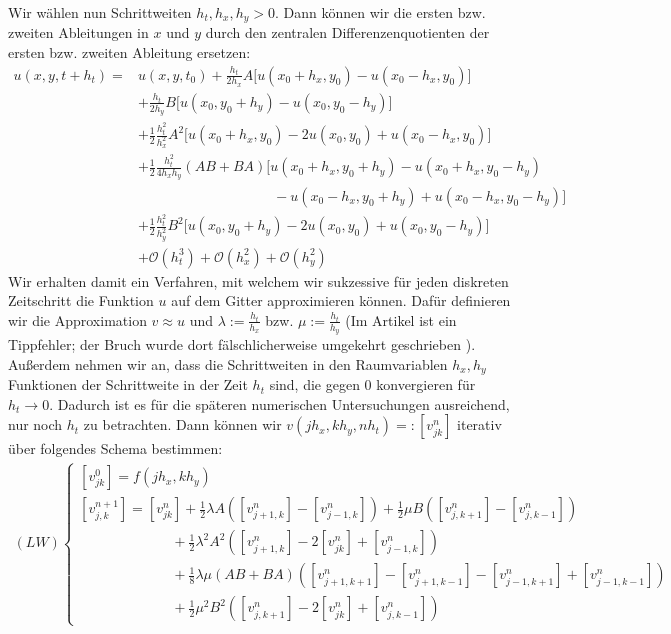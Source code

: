 \begin{ex}
    Wir wählen nun Schrittweiten $h_t, h_x, h_y > 0$. Dann können wir die ersten bzw. zweiten Ableitungen in $x$ und $y$ durch den zentralen Differenzenquotienten der ersten bzw. zweiten Ableitung ersetzen:
    \begin{align}
        u(x,y,t+h_t)  =&  u(x,y,t_0) + \frac{h_t}{2h_x} A \bigl[ u(x_0 + h_x, y_0) - u(x_0 - h_x, y_0) \bigr] \nonumber \\ 
        & + \frac{h_t}{2h_y} B \bigl[ u(x_0, y_0 + h_y) - u(x_0, y_0 - h_y) \bigr] \nonumber \\
        & + \frac{1}{2} \frac{h_t^2}{h_x^2} A^2 \bigl[ u(x_0 + h_x, y_0) - 2 u(x_0,y_0) 
        + u(x_0 - h_x, y_0) \bigr] \nonumber \\
        & + \frac{1}{2} \frac{h_t^2}{4h_x h_y} (AB+BA) \bigl[ u(x_0 + h_x, y_0 + h_y) - u(x_0 + h_x, y_0 - h_y) \nonumber \\[-10pt]
        & \phantom{mmmmmmmmmmm} - u(x_0 - h_x, y_0 + h_y) + u(x_0 - h_x, y_0 - h_y) \bigr] \nonumber \\
        & + \frac{1}{2} \frac{h_t^2}{h_y^2} B^2 \bigl[ u(x_0, y_0+ h_y) - 2 u(x_0,y_0) 
        + u(x_0 , y_0- h_y) \bigr] \nonumber \\
        & + \mathcal{O}(h_t^3) + \mathcal{O}(h_x^2) + \mathcal{O}(h_y^2)
    \end{align}
Wir erhalten damit ein Verfahren, mit welchem wir sukzessive für jeden diskreten Zeitschritt die Funktion $u$ auf dem Gitter approximieren können. Dafür definieren wir die Approximation $v \approx u$ und $\lambda:=\frac{h_t}{h_x}$ bzw. $\mu:=\frac{h_t}{h_y}$ (Im Artikel \parencite[][S. 278]{goldberg1982numerical} ist ein Tippfehler; der Bruch wurde dort fälschlicherweise umgekehrt geschrieben \parencite[vgl.][S. 99]{gustafson1997numerical}). Außerdem nehmen wir an, dass die Schrittweiten in den Raumvariablen $h_x, h_y$ Funktionen der Schrittweite in der Zeit $h_t$ sind, die gegen 0 konvergieren für $h_t \rightarrow 0$. Dadurch ist es für die späteren numerischen Untersuchungen ausreichend, nur noch $h_t$ zu betrachten. Dann können wir $v(jh_x, kh_y, nh_t) =: [v^n_{jk}]$ iterativ über folgendes Schema bestimmen:
\begin{align}
    (LW) %
    \begin{cases} 
        [v^0_{jk}] = f(jh_x, kh_y) \\[10pt]
        [v^{n+1}_{j,k}] = [v^n_{jk}] + \frac{1}{2} \lambda A ([v^n_{j+1,k}] - [v^n_{j-1,k}])+ \frac{1}{2} \mu B ([v^n_{j,k+1}] - [v^n_{j,k-1}]) \nonumber \\[7pt]
        \phantom{v^{n+1}_{j,k}] = [v^n_{jk}].} + \frac{1}{2} \lambda^2 A^2 ([v^n_{j+1,k}] - 2 [v^n_{jk}]+ [v^n_{j-1,k}]) \nonumber \\[7pt]
        \phantom{v^{n+1}_{j,k}] = [v^n_{jk}].} + \frac{1}{8} \lambda \mu  (AB+BA) ([v^n_{j+1, k+1}] - [v^n_{j+1,k-1}] - [v^n_{j-1, k+1}] + [v^n_{j-1,k-1}]) \nonumber \\[7pt]
        \phantom{v^{n+1}_{j,k}] = [v^n_{jk}].} + \frac{1}{2} \mu^2 B^2 ([v^n_{j,k+1}] - 2 [v^n_{jk}]+ [v^n_{j,k-1}])
    \end{cases}
\end{align}

\end{ex}

